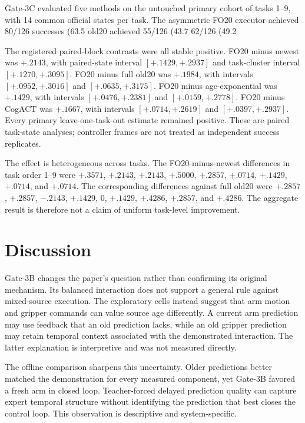 Gate-3C evaluated five methods on the untouched primary cohort of tasks 1--9,
with 14 common official states per task. The asymmetric FO20 executor achieved
80/126 successes (63.5%
old20 achieved 55/126 (43.7%
62/126 (49.2%

The registered paired-block contrasts were all stable positive. FO20 minus
newest was $+.2143$, with paired-state interval $[+.1429,+.2937]$ and
task-cluster interval $[+.1270,+.3095]$. FO20 minus full old20 was $+.1984$,
with intervals $[+.0952,+.3016]$ and $[+.0635,+.3175]$. FO20 minus
age-exponential was $+.1429$, with intervals $[+.0476,+.2381]$ and
$[+.0159,+.2778]$. FO20 minus CogACT was $+.1667$, with intervals
$[+.0714,+.2619]$ and $[+.0397,+.2937]$. Every primary leave-one-task-out
estimate remained positive. These are paired task-state analyses; controller
frames are not treated as independent success replicates.

The effect is heterogeneous across tasks. The FO20-minus-newest differences in
task order 1--9 were $+.3571$, $+.2143$, $+.2143$, $+.5000$, $+.2857$,
$+.0714$, $+.1429$, $+.0714$, and $+.0714$. The corresponding differences
against full old20 were $+.2857$, $+.2857$, $-.2143$, $+.1429$, $0$,
$+.1429$, $+.4286$, $+.2857$, and $+.4286$. The aggregate result is therefore
not a claim of uniform task-level improvement.

\section{Discussion}

Gate-3B changes the paper's question rather than confirming its original
mechanism. Its balanced interaction does not support a general rule against
mixed-source execution. The exploratory cells instead suggest that arm motion
and gripper commands can value source age differently. A current arm prediction
may use feedback that an old prediction lacks, while an old gripper prediction
may retain temporal context associated with the demonstrated interaction. The
latter explanation is interpretive and was not measured directly.

The offline comparison sharpens this uncertainty. Older predictions better
matched the demonstration for every measured component, yet Gate-3B favored a
fresh arm in closed loop. Teacher-forced delayed prediction quality can capture
expert temporal structure without identifying the prediction that best closes
the control loop. This observation is descriptive and system-specific.

